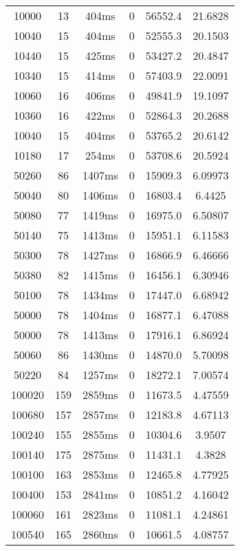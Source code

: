\documentclass[./main.tex]{subfiles}
\begin{document}
\begin{table}
\begin{tabular}{ c | c | c | c | c | c }
        10000 & 13 & 404ms & 0 & 56552.4 & 21.6828 \\
        10040 & 15 & 404ms & 0 & 52555.3 & 20.1503 \\
        \rowcolor{lightgray} 10440 & 15 & 425ms & 0 & 53427.2 & 20.4847 \\
        10340 & 15 & 414ms & 0 & 57403.9 & 22.0091 \\
        10060 & 16 & 406ms & 0 & 49841.9 & 19.1097 \\
        10360 & 16 & 422ms & 0 & 52864.3 & 20.2688 \\
        10040 & 15 & 404ms & 0 & 53765.2 & 20.6142 \\
        10180 & 17 & 254ms & 0 & 53708.6 & 20.5924 \\
        \hline
        50260 & 86 & 1407ms & 0 & 15909.3 & 6.09973 \\
        50040 & 80 & 1406ms & 0 & 16803.4 & 6.4425 \\
        50080 & 77 & 1419ms & 0 & 16975.0 & 6.50807 \\
        50140 & 75 & 1413ms & 0 & 15951.1 & 6.11583 \\
        \rowcolor{lightgray} 50300 & 78 & 1427ms & 0 & 16866.9 & 6.46666 \\
        50380 & 82 & 1415ms & 0 & 16456.1 & 6.30946 \\
        50100 & 78 & 1434ms & 0 & 17447.0 & 6.68942 \\
        50000 & 78 & 1404ms & 0 & 16877.1 & 6.47088 \\
        50000 & 78 & 1413ms & 0 & 17916.1 & 6.86924 \\
        50060 & 86 & 1430ms & 0 & 14870.0 & 5.70098 \\
        50220 & 84 & 1257ms & 0 & 18272.1 & 7.00574 \\
        \hline
        100020 & 159 & 2859ms & 0 & 11673.5 & 4.47559 \\
        100680 & 157 & 2857ms & 0 & 12183.8 & 4.67113 \\
        100240 & 155 & 2855ms & 0 & 10304.6 & 3.9507 \\
        100140 & 175 & 2875ms & 0 & 11431.1 & 4.3828 \\
        100100 & 163 & 2853ms & 0 & 12465.8 & 4.77925 \\
        100400 & 153 & 2841ms & 0 & 10851.2 & 4.16042 \\
        100060 & 161 & 2823ms & 0 & 11081.1 & 4.24861 \\
        100540 & 165 & 2860ms & 0 & 10661.5 & 4.08757 \\

\end{tabular}
\end{table}
\end{document}
